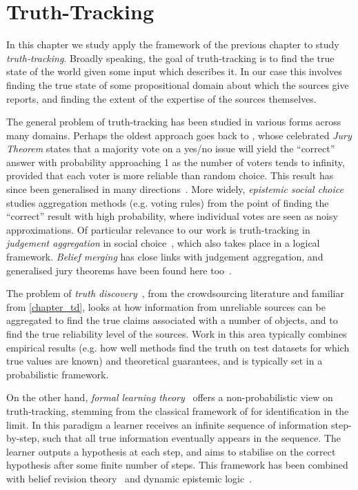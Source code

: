 \chapter{Truth-Tracking}
\label{chapter_truthtracking}

In this chapter we study apply the framework of the previous chapter to study
\emph{truth-tracking}.
%
Broadly speaking, the goal of truth-tracking is to find
the true state of the world given some input which describes it. In our case
this involves finding the true state of some propositional domain about which
the sources give reports, and finding the extent of the expertise of the
sources themselves.

The general problem of truth-tracking has been studied in various forms across
many domains. Perhaps the oldest approach goes back to \textcite{condorcet}, whose
celebrated \emph{Jury Theorem} states that a majority vote on a yes/no issue
will yield the ``correct'' answer with probability approaching 1 as the number
of voters tends to infinity, provided that each voter is more reliable than
random choice. This result has since been generalised in many
directions~\cite{grofman1983thirteen}. More widely, \emph{epistemic social
choice}~\cite{elkind2016rationalizations} studies aggregation methods (e.g.
voting rules) from the point of finding the ``correct'' result with high
probability, where individual votes are seen as noisy approximations. Of
particular relevance to our work is truth-tracking in \emph{judgement
aggregation} in social
choice~\cite{hartmann_judgment_2012,TerzopoulouEndrissSAGT2019}, which also
takes place in a logical framework. \emph{Belief merging} has close links with
judgement aggregation, and generalised jury theorems have been found here
too~\cite{everaere_epistemic_2010}.

The problem of \emph{truth discovery}~\cite{li_survey_2016}, from the
crowdsourcing literature and familiar from \cref{chapter_td}, looks at how
information from unreliable sources can be aggregated to find the true claims
associated with a number of objects, and to find the true reliability level of
the sources.  Work in this area typically combines empirical results (e.g. how
well methods find the truth on test datasets for which true values are known)
and theoretical guarantees, and is typically set in a probabilistic framework.

On the other hand, \emph{formal learning theory}~\cite{jain1999systems} offers
a non-probabilistic view on truth-tracking, stemming from the classical
framework of \textcite{Gold_1967} for identification in the limit. In this
paradigm a learner receives an infinite sequence of information step-by-step,
such that all true information eventually appears in the sequence. The learner
outputs a hypothesis at each step, and aims to stabilise on the correct
hypothesis after some finite number of steps. This framework has been combined
with belief revision theory~\cite{kelly1997reliable,baltag_tt_2019} and dynamic
epistemic logic~\cite{baltag2019dynamic}.

